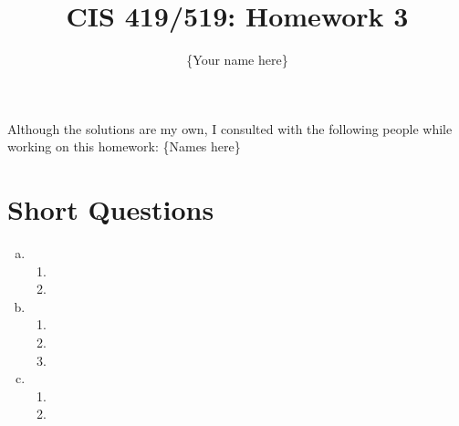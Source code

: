 \documentclass{article}
\title{CIS 419/519: Homework 3}
\author{\{Your name here\}}
\date{}
\begin{document}
\maketitle
    Although the solutions are my own, I consulted with the following people while working on this homework: \{Names here\} \\
    
    \section*{Short Questions}
    \begin{enumerate}[(a)]
        \item \begin{enumerate}[(1)]
            \item %
            \item %
        \end{enumerate}
        \item \begin{enumerate}[(1)]
            \item %
            \item %
            \item %
        \end{enumerate}
        \item \begin{enumerate}[(1)]
            \item %
            \item %
        \end{enumerate}
    \end{enumerate}
\end{document}
